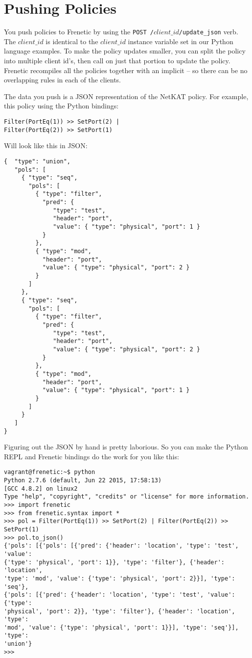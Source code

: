 \section{Pushing Policies}

You push policies to Frenetic by using the \texttt{POST /$client\_id$/update\_json} verb.  The 
$client\_id$ is identical to the $client\_id$ instance variable set in our Python language examples.
To make the policy updates smaller, you can split the policy into multiple client id's, then 
call  on just that portion to update the policy.   Frenetic recompiles all the
policies together with an implicit  -- so there can be no overlapping rules in each 
of the clients.  

The data you push is a JSON representation of the NetKAT policy.  For example, this policy using
the Python bindings:

\begin{verbatim}
Filter(PortEq(1)) >> SetPort(2) |
Filter(PortEq(2)) >> SetPort(1) 
\end{verbatim}

Will look like this in JSON:

\begin{verbatim}
{  "type": "union",
   "pols": [
     { "type": "seq",
       "pols": [
         { "type": "filter", 
           "pred": { 
              "type": "test", 
              "header": "port",
              "value": { "type": "physical", "port": 1 }
           }
         },
         { "type": "mod",
           "header": "port",
           "value": { "type": "physical", "port": 2 }
         }
       ]  
     },
     { "type": "seq",
       "pols": [
         { "type": "filter", 
           "pred": { 
              "type": "test", 
              "header": "port",
              "value": { "type": "physical", "port": 2 } 
           }
         },
         { "type": "mod",
           "header": "port",
           "value": { "type": "physical", "port": 1 }
         }
       ]  
     }
   ]
}
\end{verbatim}

Figuring out the JSON by hand is pretty laborious.  So you can make the Python REPL and Frenetic 
bindings do the work for you like this:

\begin{verbatim}
vagrant@frenetic:~$ python
Python 2.7.6 (default, Jun 22 2015, 17:58:13)
[GCC 4.8.2] on linux2
Type "help", "copyright", "credits" or "license" for more information.
>>> import frenetic
>>> from frenetic.syntax import *
>>> pol = Filter(PortEq(1)) >> SetPort(2) | Filter(PortEq(2)) >> SetPort(1)
>>> pol.to_json()
{'pols': [{'pols': [{'pred': {'header': 'location', 'type': 'test', 'value': 
{'type': 'physical', 'port': 1}}, 'type': 'filter'}, {'header': 'location', 
'type': 'mod', 'value': {'type': 'physical', 'port': 2}}], 'type': 'seq'}, 
{'pols': [{'pred': {'header': 'location', 'type': 'test', 'value': {'type': 
'physical', 'port': 2}}, 'type': 'filter'}, {'header': 'location', 'type': 
'mod', 'value': {'type': 'physical', 'port': 1}}], 'type': 'seq'}], 'type': 
'union'}
>>>
\end{verbatim}

